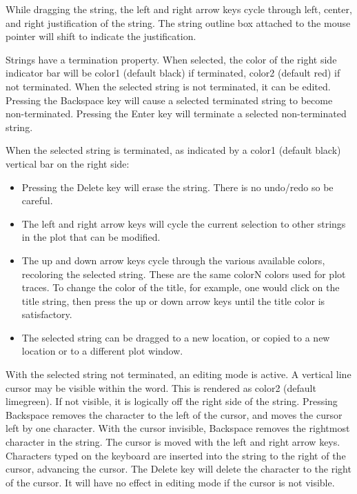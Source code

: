 While dragging the string, the left and right arrow keys cycle through
left, center, and right justification of the string.  The string
outline box attached to the mouse pointer will shift to indicate the
justification.

Strings have a termination property.  When selected, the color of the
right side indicator bar will be color1 (default black) if terminated,
color2 (default red) if not terminated.  When the selected string is
not terminated, it can be edited.  Pressing the {\cb Backspace} key
will cause a selected terminated string to become non-terminated. 
Pressing the {\cb Enter} key will terminate a selected non-terminated
string.

When the selected string is terminated, as indicated by a color1
(default black) vertical bar on the right side:

\begin{itemize}
\item{Pressing the {\cb Delete} key will erase the string.  There is
no undo/redo so be careful.}

\item{The left and right arrow keys will cycle the current selection
to other strings in the plot that can be modified.}

\item{The up and down arrow keys cycle through the various available
colors, recoloring the selected string.  These are the same colorN
colors used for plot traces.  To change the color of the title, for
example, one would click on the title string, then press the up or
down arrow keys until the title color is satisfactory.}

\item{The selected string can be dragged to a new location, or copied
to a new location or to a different plot window.}
\end{itemize}

With the selected string not terminated, an editing mode is active.  A
vertical line cursor may be visible within the word.  This is rendered
as color2 (default limegreen).  If not visible, it is logically off
the right side of the string.  Pressing {\cb Backspace} removes the
character to the left of the cursor, and moves the cursor left by one
character.  With the cursor invisible, {\cb Backspace} removes the
rightmost character in the string.  The cursor is moved with the left
and right arrow keys.  Characters typed on the keyboard are inserted
into the string to the right of the cursor, advancing the cursor.  The
{\cb Delete} key will delete the character to the right of the cursor. 
It will have no effect in editing mode if the cursor is not visible.

